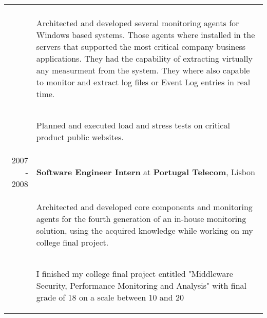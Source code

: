 \documentclass[a4paper,10pt]{article}
\begin{document}
\begin{tabular}{rp{11cm}}
\begin{compactitem}
     \end{compactitem}\vspace{-1em} \\
  & \begin{compactitem} 
     \item Architected and developed several monitoring agents for Windows based systems. Those agents where installed in the servers that supported the most critical company business applications. They had the capability of extracting virtually any measurment from the system. They where also capable to monitor and extract log files or Event Log entries in real time.
     \end{compactitem}\vspace{-1em} \\
  & \begin{compactitem} 
     \item Planned and executed load and stress tests on critical product public websites.
     \end{compactitem}\vspace{-1em} \\
  \textsc{2007 - 2008} & \textbf{Software Engineer Intern} at \textbf{Portugal Telecom}, Lisbon\\ 
   & \begin{compactitem}
   \item Architected and developed core components and monitoring agents for the fourth generation of an in-house monitoring solution, using the acquired knowledge
   while working on my college final project.
   \end{compactitem}\vspace{-1em} \\
  & \begin{compactitem}
   \item I finished my college final project entitled "Middleware Security, Performance Monitoring and Analysis" with final grade of 18 on a scale between 10 and 20
   \end{compactitem}\vspace{-1em} \\

\end{tabular}
\end{document}
